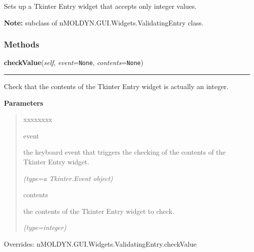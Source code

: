 Sets up a Tkinter Entry widget that accepts only integer values.

\textbf{Note:} subclass of nMOLDYN.GUI.Widgets.ValidatingEntry class.





  \subsubsection{Methods}

    \vspace{0.5ex}

\hspace{.8\funcindent}\begin{boxedminipage}{\funcwidth}

    \raggedright \textbf{checkValue}(\textit{self}, \textit{event}={\tt None}, \textit{contents}={\tt None})

    \vspace{-1.5ex}

    \rule{\textwidth}{0.5\fboxrule}
\setlength{\parskip}{2ex}
    Check that the contents of the Tkinter Entry widget is actually an 
    integer.

\setlength{\parskip}{1ex}
      \textbf{Parameters}
      \vspace{-1ex}

      \begin{quote}
        \begin{Ventry}{xxxxxxxx}

          \item[event]

          the keyboard event that triggers the checking of the contents of 
          the Tkinter Entry widget.

            {\it (type=a Tkinter.Event object)}

          \item[contents]

          the contents of the Tkinter Entry widget to check.

            {\it (type=integer)}

        \end{Ventry}

      \end{quote}

      Overrides: nMOLDYN.GUI.Widgets.ValidatingEntry.checkValue

    \end{boxedminipage}


